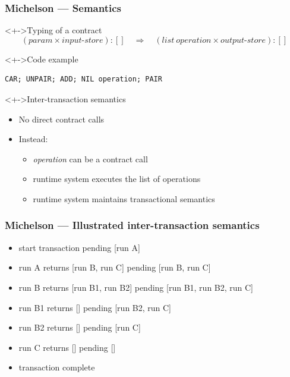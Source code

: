 \documentclass[aspectratio=1610]{beamer}
\begin{document}
\begin{frame}[fragile]
  \frametitle{Michelson --- Semantics}
\begin{block}<+->{Typing of a contract}
  \Large\vspace{-\baselineskip}
  \begin{displaymath}
    (\mathit{param} \times \mathit{input\text{-}store}) : [] \quad\Rightarrow\quad
    (\mathit{list~operation} \times \mathit{output\text{-}store}) : []
  \end{displaymath}
\end{block}
\begin{exampleblock}<+->{Code example}
\begin{verbatim}
CAR; UNPAIR; ADD; NIL operation; PAIR
\end{verbatim}
\end{exampleblock}
\begin{block}<+->{Inter-transaction semantics}
  \begin{itemize}
  \item No direct contract calls
  \item Instead:
    \begin{itemize}
    \item \textit{operation} can be a contract call
    \item runtime system executes the list of operations
    \item runtime system maintains transactional semantics
    \end{itemize}
  \end{itemize}
\end{block}
\end{frame}
\begin{frame}
  \frametitle{Michelson --- Illustrated inter-transaction semantics}
  \begin{itemize}[<+->]
  \item start transaction \hfill pending [run A]
  \item run A\phantom{2} \qquad returns \qquad{} [run B, run C] \hfill pending [run B, run C]
  \item run B\phantom{2} \qquad returns \qquad{} [run B1, run B2] \hfill pending [run B1, run B2, run C]
  \item run B1 \qquad returns \qquad{} []  \hfill pending [run B2, run C]
  \item run B2 \qquad returns \qquad{} []  \hfill pending [run C]
  \item run C\phantom{2} \qquad returns \qquad{} []  \hfill pending []
  \item transaction complete
  \end{itemize}
  
\end{frame}
\end{document}
